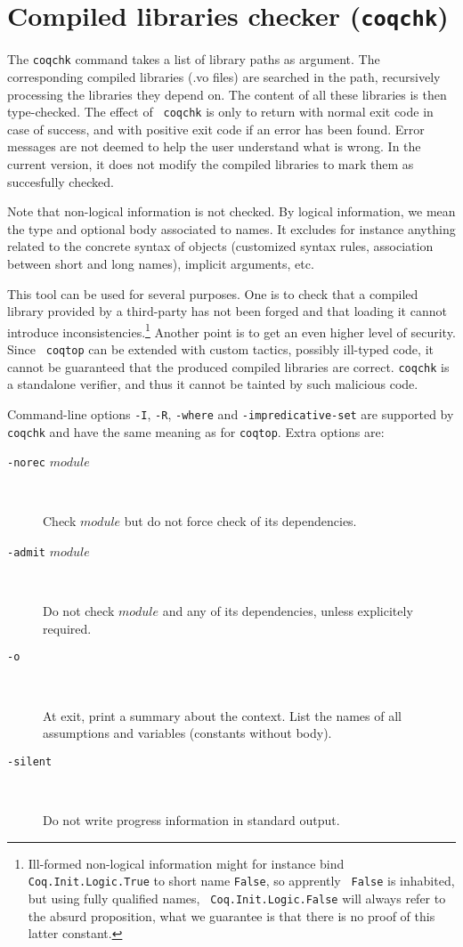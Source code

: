 \section{Compiled libraries checker ({\tt coqchk})}

The {\tt coqchk} command takes a list of library paths as argument.
The corresponding compiled libraries (.vo files) are searched in the
path, recursively processing the libraries they depend on. The content
of all these libraries is then type-checked. The effect of {\tt
  coqchk} is only to return with normal exit code in case of success,
and with positive exit code if an error has been found. Error messages
are not deemed to help the user understand what is wrong. In the
current version, it does not modify the compiled libraries to mark
them as succesfully checked.

Note that non-logical information is not checked. By logical
information, we mean the type and optional body associated to names.
It excludes for instance anything related to the concrete syntax of
objects (customized syntax rules, association between short and long
names), implicit arguments, etc.

This tool can be used for several purposes. One is to check that a
compiled library provided by a third-party has not been forged and
that loading it cannot introduce inconsistencies.\footnote{Ill-formed
  non-logical information might for instance bind {\tt
    Coq.Init.Logic.True} to short name {\tt False}, so apprently {\tt
    False} is inhabited, but using fully qualified names, {\tt
    Coq.Init.Logic.False} will always refer to the absurd proposition,
  what we guarantee is that there is no proof of this latter
  constant.}
Another point is to get an even higher level of security. Since {\tt
  coqtop} can be extended with custom tactics, possibly ill-typed
code, it cannot be guaranteed that the produced compiled libraries are
correct. {\tt coqchk} is a standalone verifier, and thus it cannot be
tainted by such malicious code.

Command-line options {\tt -I}, {\tt -R}, {\tt -where} and
{\tt -impredicative-set} are supported by {\tt coqchk} and have the
same meaning as for {\tt coqtop}. Extra options are:
\begin{description}
\item[{\tt -norec} $module$]\ 

  Check $module$ but do not force check of its dependencies.
\item[{\tt -admit} $module$] \

  Do not check $module$ and any of its dependencies, unless
  explicitely required.
\item[{\tt -o}]\ 

  At exit, print a summary about the context. List the names of all
  assumptions and variables (constants without body).
\item[{\tt -silent}]\ 

  Do not write progress information in standard output.
\end{description}

